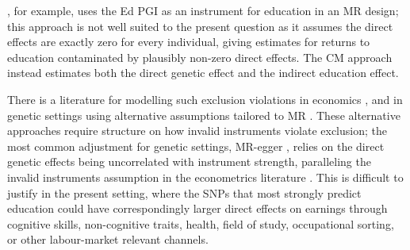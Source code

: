 \cite{widding2026}, for example, uses the Ed PGI as an instrument for education in an MR design; this approach is not well suited to the present question as it assumes the direct effects are exactly zero for every individual, giving estimates for returns to education contaminated by plausibly non-zero direct effects.
The CM approach instead estimates both the direct genetic effect and the indirect education effect.

There is a literature for modelling such exclusion violations in economics \citep{conley2012plausibly,kolesar2015}, and in genetic settings using alternative assumptions tailored to MR \citep{bowden2015mendelian,spiller2019detecting}.
These alternative approaches require structure on how invalid instruments violate exclusion; the most common adjustment for genetic settings, MR-egger \citep{bowden2015mendelian}, relies on the direct genetic effects being uncorrelated with instrument strength, paralleling the invalid instruments assumption in the econometrics literature \citep{kolesar2015}. 
This is difficult to justify in the present setting, where the SNPs that most strongly predict education could have correspondingly larger direct effects on earnings through cognitive skills, non-cognitive traits, health, field of study, occupational sorting, or other labour-market relevant channels.

